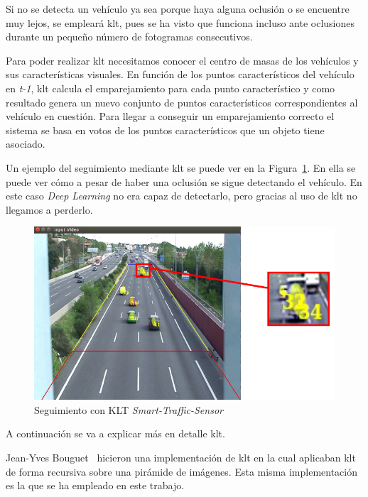 Si no se detecta un vehículo ya sea porque haya alguna oclusión o se encuentre muy lejos, se empleará \acrshort{klt}, pues se ha visto que funciona incluso ante oclusiones durante un pequeño número de fotogramas consecutivos.

Para poder realizar \acrshort{klt} necesitamos conocer el centro de masas de los vehículos y sus características visuales. En función de los puntos característicos del vehículo en \textit{t-1}, \acrshort{klt} calcula el emparejamiento para cada punto característico y como resultado genera un nuevo conjunto de puntos característicos correspondientes al vehículo en cuestión. Para llegar a conseguir un emparejamiento correcto el sistema se basa en votos de los puntos característicos que un objeto tiene asociado. 

Un ejemplo del seguimiento mediante \acrshort{klt} se puede ver en la Figura~\ref{fig.klt_deteccion}. En ella se puede ver cómo a pesar de haber una oclusión se sigue detectando el vehículo. En este caso \textit{Deep Learning} no era capaz de detectarlo, pero gracias al uso de \acrshort{klt} no llegamos a perderlo.

 \begin{figure}[H] 
\begin{center}
   \includegraphics[scale=0.5]{figures/Diseno_global/klt_deteccion.png}
   \caption{Seguimiento con KLT \textit{Smart-Traffic-Sensor}}
	\label{fig.klt_deteccion}
\end{center}
\end{figure}

A continuación se va a explicar más en detalle \acrshort{klt}.

Jean-Yves Bouguet~\cite{klt_bouguet} hicieron una implementación de \acrshort{klt} en la cual aplicaban \acrshort{klt} de forma recursiva sobre una pirámide de imágenes. Esta misma implementación es la que se ha empleado en este trabajo. 

